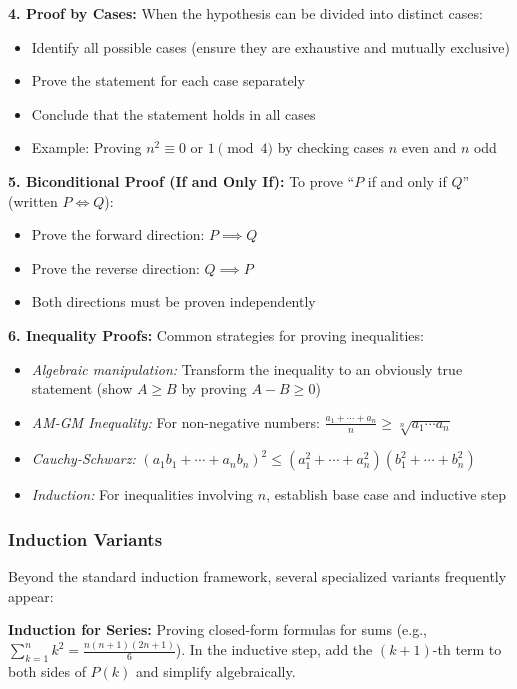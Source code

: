 \documentclass[12pt]{article}
\begin{document}
\textbf{4. Proof by Cases:} When the hypothesis can be divided into distinct cases:
\begin{itemize}
    \item Identify all possible cases (ensure they are exhaustive and mutually exclusive)
    \item Prove the statement for each case separately
    \item Conclude that the statement holds in all cases
    \item Example: Proving $n^2 \equiv 0$ or $1 \pmod{4}$ by checking cases $n$ even and $n$ odd
\end{itemize}

\textbf{5. Biconditional Proof (If and Only If):} To prove ``$P$ if and only if $Q$'' (written $P \iff Q$):
\begin{itemize}
    \item Prove the forward direction: $P \implies Q$
    \item Prove the reverse direction: $Q \implies P$
    \item Both directions must be proven independently
\end{itemize}

\textbf{6. Inequality Proofs:} Common strategies for proving inequalities:
\begin{itemize}
    \item \textit{Algebraic manipulation:} Transform the inequality to an obviously true statement (show $A \geq B$ by proving $A - B \geq 0$)
    \item \textit{AM-GM Inequality:} For non-negative numbers: $\frac{a_1 + \cdots + a_n}{n} \geq \sqrt[n]{a_1 \cdots a_n}$
    \item \textit{Cauchy-Schwarz:} $(a_1b_1 + \cdots + a_nb_n)^2 \leq (a_1^2 + \cdots + a_n^2)(b_1^2 + \cdots + b_n^2)$
    \item \textit{Induction:} For inequalities involving $n$, establish base case and inductive step
\end{itemize}

\subsubsection*{Induction Variants}

Beyond the standard induction framework, several specialized variants frequently appear:

\textbf{Induction for Series:} Proving closed-form formulas for sums (e.g., $\sum_{k=1}^n k^2 = \frac{n(n+1)(2n+1)}{6}$). In the inductive step, add the $(k+1)$-th term to both sides of $P(k)$ and simplify algebraically.
\end{document}
